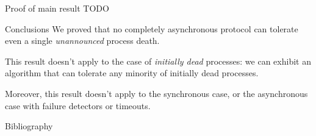 \documentclass[12pt]{beamer}
\begin{document}
  \begin{frame}{Proof of main result}
    TODO
  \end{frame}

  \begin{frame}{Conclusions}
    We proved that no completely asynchronous protocol can tolerate even a
    single \emph{unannounced} process death.

    \vspace{0.25cm}

    This result doesn't apply to the case of \emph{initially dead} processes:
    we can exhibit an algorithm that can tolerate any minority of initially
    dead processes.

    \vspace{0.25cm}

    Moreover, this result doesn't apply to the synchronous case, or the
    asynchronous case with failure detectors or timeouts.
  \end{frame}

  \begin{frame}{Bibliography}
    
  \end{frame}
\end{document}
